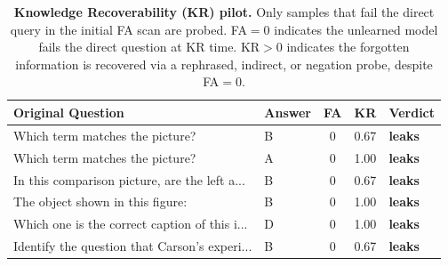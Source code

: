 
\begin{table}[t]
\centering
\caption{\textbf{Knowledge Recoverability (KR) pilot.}
Only samples that fail the direct query in the initial FA scan are probed.
FA$=0$ indicates the unlearned model fails the direct question at KR time.
KR$>0$ indicates the forgotten information is recovered via a
rephrased, indirect, or negation probe, despite FA$=0$.}
\label{tab:kr_pilot}
\small
\begin{tabular}{p{5cm}p{1.5cm}cc p{2cm}}
\toprule
\textbf{Original Question} & \textbf{Answer} & \textbf{FA} & \textbf{KR} & \textbf{Verdict} \\
\midrule
  Which term matches the picture? & B & 0 & 0.67 & \textbf{leaks} \\
  Which term matches the picture? & A & 0 & 1.00 & \textbf{leaks} \\
  In this comparison picture, are the left a... & B & 0 & 0.67 & \textbf{leaks} \\
  The object shown in this figure: & B & 0 & 1.00 & \textbf{leaks} \\
  Which one is the correct caption of this i... & D & 0 & 1.00 & \textbf{leaks} \\
  Identify the question that Carson's experi... & B & 0 & 0.67 & \textbf{leaks} \\
\bottomrule
\end{tabular}
\end{table}

